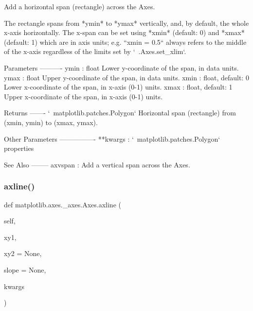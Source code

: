 \begin{DoxyVerb}Add a horizontal span (rectangle) across the Axes.

The rectangle spans from *ymin* to *ymax* vertically, and, by default,
the whole x-axis horizontally.  The x-span can be set using *xmin*
(default: 0) and *xmax* (default: 1) which are in axis units; e.g.
``xmin = 0.5`` always refers to the middle of the x-axis regardless of
the limits set by `~.Axes.set_xlim`.

Parameters
----------
ymin : float
    Lower y-coordinate of the span, in data units.
ymax : float
    Upper y-coordinate of the span, in data units.
xmin : float, default: 0
    Lower x-coordinate of the span, in x-axis (0-1) units.
xmax : float, default: 1
    Upper x-coordinate of the span, in x-axis (0-1) units.

Returns
-------
`~matplotlib.patches.Polygon`
    Horizontal span (rectangle) from (xmin, ymin) to (xmax, ymax).

Other Parameters
----------------
**kwargs : `~matplotlib.patches.Polygon` properties


See Also
--------
axvspan : Add a vertical span across the Axes.
\end{DoxyVerb}
 \mbox{\label{classmatplotlib_1_1axes_1_1__axes_1_1Axes_ae0a16b77e61db36638b6bd09dfdecd9f}} 
\subsubsection{\texorpdfstring{axline()}{axline()}}
{\footnotesize\ttfamily def matplotlib.\+axes.\+\_\+axes.\+Axes.\+axline (\begin{DoxyParamCaption}\item[{}]{self,  }\item[{}]{xy1,  }\item[{}]{xy2 = {\ttfamily None},  }\item[{}]{slope = {\ttfamily None},  }\item[{}]{kwargs }\end{DoxyParamCaption})}

